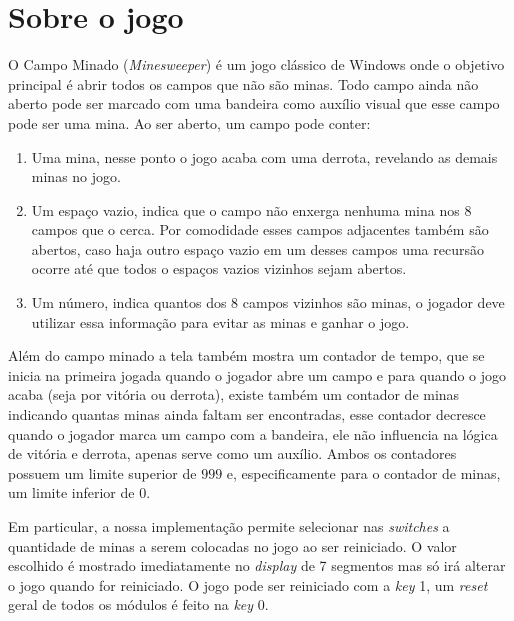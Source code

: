 \documentclass[12pt]{article}
\begin{document}




\section{Sobre o jogo}
\label{sec:gameinfo}

O Campo Minado (\emph{Minesweeper}) é um jogo clássico de Windows onde o
objetivo principal é abrir todos os campos que não são minas. Todo campo ainda
não aberto pode ser marcado com uma bandeira como auxílio visual que esse campo
pode ser uma mina. Ao ser aberto, um campo pode conter: 

\begin{enumerate}

	\item Uma mina, nesse ponto o jogo acaba com uma derrota, revelando as 
		demais minas no jogo.
		
	\item Um espaço vazio, indica que o campo não enxerga nenhuma mina nos
		8 campos que o cerca. Por comodidade esses campos adjacentes também são
		abertos, caso haja outro espaço vazio em um desses campos uma recursão
		ocorre até que todos o espaços vazios vizinhos sejam abertos.
		
	\item Um número, indica quantos dos 8 campos vizinhos são minas, o jogador
		deve utilizar essa informação para evitar as minas e ganhar o jogo.

\end{enumerate}

Além do campo minado a tela também mostra um contador de tempo, que se inicia
na primeira jogada quando o jogador abre um campo e para quando o jogo acaba
(seja por vitória ou derrota), existe também um contador de minas indicando
quantas minas ainda faltam ser encontradas, esse contador decresce quando o
jogador marca um campo com a bandeira, ele não influencia na lógica de
vitória e derrota, apenas serve como um auxílio. Ambos os contadores possuem
um limite superior de $999$ e, especificamente para o contador de minas, um
limite inferior de $0$.

Em particular, a nossa implementação permite selecionar nas \emph{switches}
a quantidade de minas a serem colocadas no jogo ao ser reiniciado. O valor
escolhido é mostrado imediatamente no \emph{display} de 7 segmentos mas só
irá alterar o jogo quando for reiniciado. O jogo pode ser reiniciado com
a \emph{key} 1, um \emph{reset} geral de todos os módulos é feito na
\emph{key} 0.
\end{document}
